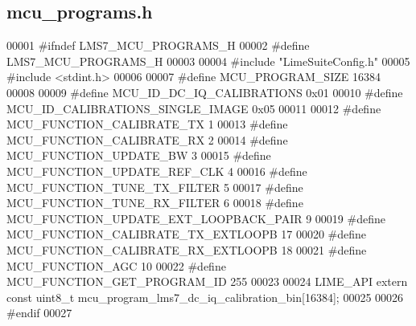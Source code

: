 \subsection{mcu\+\_\+programs.\+h}
\label{mcu__programs_8h_source}

\begin{DoxyCode}
00001 \textcolor{preprocessor}{#ifndef LMS7\_MCU\_PROGRAMS\_H}
00002 \textcolor{preprocessor}{#define LMS7\_MCU\_PROGRAMS\_H}
00003 
00004 \textcolor{preprocessor}{#include "LimeSuiteConfig.h"}
00005 \textcolor{preprocessor}{#include <stdint.h>}
00006 
00007 \textcolor{preprocessor}{#define MCU\_PROGRAM\_SIZE 16384}
00008 
00009 \textcolor{preprocessor}{#define MCU\_ID\_DC\_IQ\_CALIBRATIONS 0x01}
00010 \textcolor{preprocessor}{#define MCU\_ID\_CALIBRATIONS\_SINGLE\_IMAGE 0x05}
00011 
00012 \textcolor{preprocessor}{#define MCU\_FUNCTION\_CALIBRATE\_TX 1}
00013 \textcolor{preprocessor}{#define MCU\_FUNCTION\_CALIBRATE\_RX 2}
00014 \textcolor{preprocessor}{#define MCU\_FUNCTION\_UPDATE\_BW 3}
00015 \textcolor{preprocessor}{#define MCU\_FUNCTION\_UPDATE\_REF\_CLK 4}
00016 \textcolor{preprocessor}{#define MCU\_FUNCTION\_TUNE\_TX\_FILTER 5}
00017 \textcolor{preprocessor}{#define MCU\_FUNCTION\_TUNE\_RX\_FILTER 6}
00018 \textcolor{preprocessor}{#define MCU\_FUNCTION\_UPDATE\_EXT\_LOOPBACK\_PAIR 9}
00019 \textcolor{preprocessor}{#define MCU\_FUNCTION\_CALIBRATE\_TX\_EXTLOOPB 17}
00020 \textcolor{preprocessor}{#define MCU\_FUNCTION\_CALIBRATE\_RX\_EXTLOOPB 18}
00021 \textcolor{preprocessor}{#define MCU\_FUNCTION\_AGC 10}
00022 \textcolor{preprocessor}{#define MCU\_FUNCTION\_GET\_PROGRAM\_ID 255}
00023 
00024 LIME_API \textcolor{keyword}{extern} \textcolor{keyword}{const} uint8\_t mcu_program_lms7_dc_iq_calibration_bin[16384];
00025 
00026 \textcolor{preprocessor}{#endif}
00027 
\end{DoxyCode}
